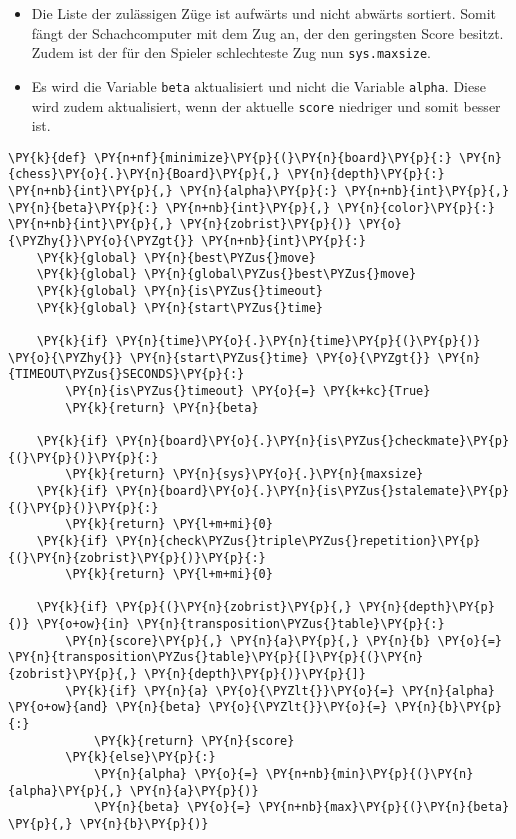 \begin{itemize}
\tightlist
\item
  Die Liste der zulässigen Züge ist aufwärts und nicht abwärts sortiert.
  Somit fängt der Schachcomputer mit dem Zug an, der den geringsten
  Score besitzt. Zudem ist der für den Spieler schlechteste Zug nun
  \texttt{sys.maxsize}.
\item
  Es wird die Variable \texttt{beta} aktualisiert und nicht die Variable
  \texttt{alpha}. Diese wird zudem aktualisiert, wenn der aktuelle
  \texttt{score} niedriger und somit besser ist.
\end{itemize}

\bigskip

    \begin{tcolorbox}[fontupper=\linespread{.66}\selectfont, breakable, size=fbox, boxrule=1pt, pad at break*=1mm,colback=cellbackground, colframe=cellborder]
\begin{Verbatim}[commandchars=\\\{\}]
\PY{k}{def} \PY{n+nf}{minimize}\PY{p}{(}\PY{n}{board}\PY{p}{:} \PY{n}{chess}\PY{o}{.}\PY{n}{Board}\PY{p}{,} \PY{n}{depth}\PY{p}{:} \PY{n+nb}{int}\PY{p}{,} \PY{n}{alpha}\PY{p}{:} \PY{n+nb}{int}\PY{p}{,} \PY{n}{beta}\PY{p}{:} \PY{n+nb}{int}\PY{p}{,} \PY{n}{color}\PY{p}{:} \PY{n+nb}{int}\PY{p}{,} \PY{n}{zobrist}\PY{p}{)} \PY{o}{\PYZhy{}}\PY{o}{\PYZgt{}} \PY{n+nb}{int}\PY{p}{:}
    \PY{k}{global} \PY{n}{best\PYZus{}move}
    \PY{k}{global} \PY{n}{global\PYZus{}best\PYZus{}move}
    \PY{k}{global} \PY{n}{is\PYZus{}timeout}
    \PY{k}{global} \PY{n}{start\PYZus{}time}
    
    \PY{k}{if} \PY{n}{time}\PY{o}{.}\PY{n}{time}\PY{p}{(}\PY{p}{)} \PY{o}{\PYZhy{}} \PY{n}{start\PYZus{}time} \PY{o}{\PYZgt{}} \PY{n}{TIMEOUT\PYZus{}SECONDS}\PY{p}{:}
        \PY{n}{is\PYZus{}timeout} \PY{o}{=} \PY{k+kc}{True}
        \PY{k}{return} \PY{n}{beta}
    
    \PY{k}{if} \PY{n}{board}\PY{o}{.}\PY{n}{is\PYZus{}checkmate}\PY{p}{(}\PY{p}{)}\PY{p}{:}
        \PY{k}{return} \PY{n}{sys}\PY{o}{.}\PY{n}{maxsize}
    \PY{k}{if} \PY{n}{board}\PY{o}{.}\PY{n}{is\PYZus{}stalemate}\PY{p}{(}\PY{p}{)}\PY{p}{:}
        \PY{k}{return} \PY{l+m+mi}{0}
    \PY{k}{if} \PY{n}{check\PYZus{}triple\PYZus{}repetition}\PY{p}{(}\PY{n}{zobrist}\PY{p}{)}\PY{p}{:}
        \PY{k}{return} \PY{l+m+mi}{0}
    
    \PY{k}{if} \PY{p}{(}\PY{n}{zobrist}\PY{p}{,} \PY{n}{depth}\PY{p}{)} \PY{o+ow}{in} \PY{n}{transposition\PYZus{}table}\PY{p}{:}
        \PY{n}{score}\PY{p}{,} \PY{n}{a}\PY{p}{,} \PY{n}{b} \PY{o}{=} \PY{n}{transposition\PYZus{}table}\PY{p}{[}\PY{p}{(}\PY{n}{zobrist}\PY{p}{,} \PY{n}{depth}\PY{p}{)}\PY{p}{]}
        \PY{k}{if} \PY{n}{a} \PY{o}{\PYZlt{}}\PY{o}{=} \PY{n}{alpha} \PY{o+ow}{and} \PY{n}{beta} \PY{o}{\PYZlt{}}\PY{o}{=} \PY{n}{b}\PY{p}{:}
            \PY{k}{return} \PY{n}{score}
        \PY{k}{else}\PY{p}{:}
            \PY{n}{alpha} \PY{o}{=} \PY{n+nb}{min}\PY{p}{(}\PY{n}{alpha}\PY{p}{,} \PY{n}{a}\PY{p}{)}
            \PY{n}{beta} \PY{o}{=} \PY{n+nb}{max}\PY{p}{(}\PY{n}{beta} \PY{p}{,} \PY{n}{b}\PY{p}{)}
    

\end{Verbatim}
\end{tcolorbox}
